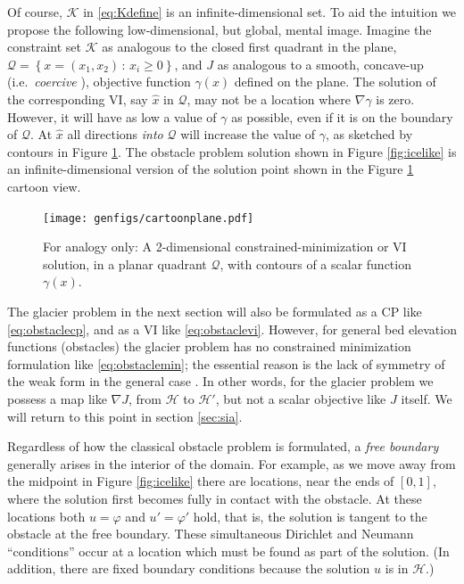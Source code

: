 \documentclass[letterpaper,final,12pt,reqno]{amsart}
\theoremstyle{claim}
\newcommand{\grad}{\nabla}
\numberwithin{equation}{section}
\numberwithin{figure}{section}
\numberwithin{table}{section}
\begin{document}
Of course, $\mathcal{K}$ in \eqref{eq:Kdefine} is an infinite-dimensional set.  To aid the intuition we propose the following low-dimensional, but global, mental image.  Imagine the constraint set $\mathcal{K}$ as analogous to the closed first quadrant in the plane, $\mathcal{Q} = \left\{x = (x_1,x_2)\,:\,x_i\ge 0\right\}$, and $J$ as analogous to a smooth, concave-up (i.e.~\emph{coercive} \cite{Evans2010}), objective function $\gamma(x)$ defined on the plane.  The solution of the corresponding VI, say $\hat x$ in $\mathcal{Q}$, may not be a location where $\nabla \gamma$ is zero.  However, it will have as low a value of $\gamma$ as possible, even if it is on the boundary of $\mathcal{Q}$.  At $\hat x$ all directions \emph{into} $\mathcal{Q}$ will increase the value of $\gamma$, as sketched by contours in Figure \ref{fig:cartoonplane}.  The obstacle problem solution shown in Figure \ref{fig:icelike} is an infinite-dimensional version of the solution point shown in the Figure \ref{fig:cartoonplane} cartoon view.

\begin{figure}
\texttt{[image: genfigs/cartoonplane.pdf]}
\caption{For analogy only:  A 2-dimensional constrained-minimization or VI solution, in a planar quadrant $\mathcal{Q}$, with contours of a scalar function $\gamma(x)$.}
\label{fig:cartoonplane}
\end{figure}

The glacier problem in the next section will also be formulated as a CP like \eqref{eq:obstaclecp}, and as a VI like \eqref{eq:obstaclevi}.  However, for general bed elevation functions (obstacles) the glacier problem has no constrained minimization formulation like \eqref{eq:obstaclemin}; the essential reason is the lack of symmetry of the weak form in the general case \cite{JouvetBueler2012}.  In other words, for the glacier problem we possess a map like $\grad J$, from $\mathcal{H}$ to $\mathcal{H}'$, but not a scalar objective like $J$ itself.  We will return to this point in section \ref{sec:sia}.

Regardless of how the classical obstacle problem is formulated, a \emph{free boundary} generally arises in the interior of the domain.  For example, as we move away from the midpoint in Figure \ref{fig:icelike} there are locations, near the ends of $[0,1]$, where the solution first becomes fully in contact with the obstacle.  At these locations both $u=\varphi$ and $u'=\varphi'$ hold, that is, the solution is tangent to the obstacle at the free boundary.  These simultaneous Dirichlet and Neumann ``conditions'' occur at a location which must be found as part of the solution.  (In addition, there are fixed boundary conditions because the solution $u$ is in $\mathcal{H}$.)
\end{document}
